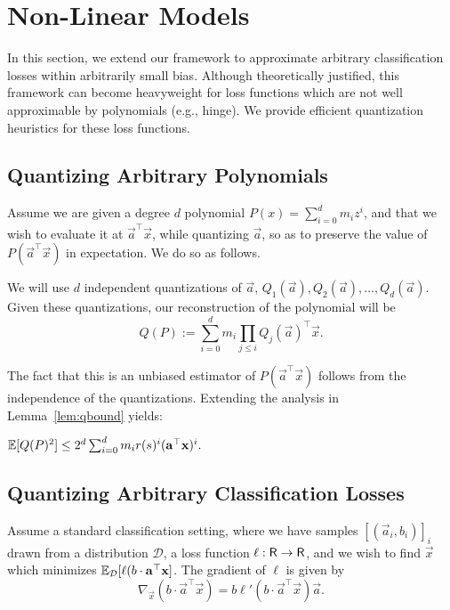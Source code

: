 \section{Non-Linear Models}

In this section, we extend our framework to approximate arbitrary classification losses within arbitrarily small bias. 
Although theoretically justified, this framework can become heavyweight for loss functions which are not well approximable by polynomials 
(e.g., hinge). We provide efficient quantization heuristics for these loss functions. 

\subsection{Quantizing Arbitrary Polynomials} 

Assume we are given a degree $d$ polynomial $P(x) = \sum_{i = 0}^{d} m_i z^i$, and that 
we wish to evaluate it at $\vec{a}^\top \vec{x}$, while quantizing $\vec{a}$, so as to preserve the value of $P( \vec{a}^\top \vec{x})$ in expectation. 
We do so as follows. 

We will use $d$ independent quantizations of $\vec{a}$, $Q_1(\vec{a}), Q_2(\vec{a}), \ldots, Q_d(\vec{a})$. 
Given these quantizations, our reconstruction of the polynomial will be 
$$ Q(P) := \sum_{i = 0}^d m_i \prod_{j \leq i} Q_j(\vec{a})^\top \vec{x}.$$

The fact that this is an unbiased estimator of $P( \vec{a}^\top \vec{x} )$ follows from the independence of the quantizations. Extending the analysis in Lemma~\ref{lem:qbound} yields:

\begin{lemma}
\label{lem:poly-sec-moment-bound}
	$\mathbb{E}[ Q(P)^2 ] \leq 2^d \sum_{i = 0}^d m_i r(s)^i (\mathbf{a}^\top \mathbf{x})^i.$
\end{lemma} 








\subsection{Quantizing Arbitrary Classification Losses}

Assume a standard classification setting, where we have samples $[(\vec{a}_i, b_i)]_i$ drawn from a distribution $\mathcal{D}$, a loss function $\ell: \mathsf{R} \rightarrow \mathsf{R}$, and we wish to find $\vec{x}$ which minimizes $\mathbb{E}_{\mathcal{D}} [ \ell( b \cdot \mathbf{a}^\top \mathbf{x} ]$. The gradient of $\ell$ is given by 
$$ \nabla_\vec{x} (b \cdot \vec{a}^\top \vec{x}) = b \ell' (b \cdot \vec{a}^\top \vec{x}) \vec{a}.$$

